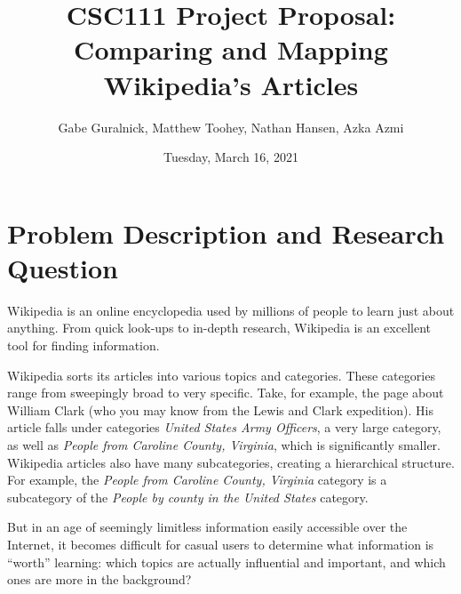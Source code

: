 \documentclass[fontsize=11pt]{article}
\title{CSC111 Project Proposal: Comparing and Mapping Wikipedia's Articles}
\author{Gabe Guralnick, Matthew Toohey, Nathan Hansen, Azka Azmi}
\date{Tuesday, March 16, 2021}
\begin{document}
\maketitle

\section*{Problem Description and Research Question}



Wikipedia is an online encyclopedia used by millions of people to learn just about anything. From quick look-ups to in-depth research, Wikipedia is an excellent tool for finding information. 

Wikipedia sorts its articles into various topics and categories. These categories range from sweepingly broad to very specific. Take, for example, the page about William Clark (who you may know from the Lewis and Clark expedition). His article falls under categories \textit{United States Army Officers}, a very large category, as well as \textit{People from Caroline County, Virginia}, which is significantly smaller. Wikipedia articles also have many subcategories, creating a hierarchical structure. For example, the \textit{People from Caroline County, Virginia} category is a subcategory of the \textit{People by county in the United States} category.

But in an age of seemingly limitless information easily accessible over the Internet, it becomes difficult for casual users to determine what information is ``worth'' learning: which topics are actually influential and important, and which ones are more in the background?
\end{document}
